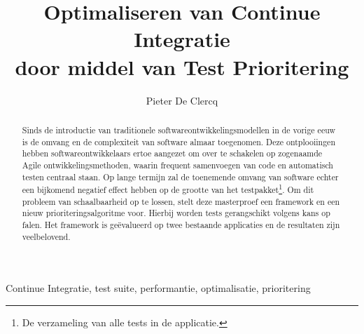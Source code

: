 \documentclass[10pt,twocolumn,twoside]{phdsymp-nl}
\begin{document}
	\title{Optimaliseren van Continue Integratie\\ door middel van Test Prioritering}
	\author{Pieter De Clercq}
	\maketitle
	
	\begin{abstract}
	Sinds de introductie van traditionele softwareontwikkelingsmodellen in de vorige eeuw is de omvang en de complexiteit van software almaar toegenomen. Deze ontplooiingen hebben softwareontwikkelaars ertoe aangezet om over te schakelen op zogenaamde Agile ontwikkelingsmethoden, waarin frequent samenvoegen van code en automatisch testen centraal staan. Op lange termijn zal de toenemende omvang van software echter een bijkomend negatief effect hebben op de grootte van het testpakket\footnote{De verzameling van alle tests in de applicatie.}. Om dit probleem van schaalbaarheid op te lossen, stelt deze masterproef een framework en een nieuw prioriteringsalgoritme voor. Hierbij worden tests gerangschikt volgens kans op falen. Het framework is ge\"evalueerd op twee bestaande applicaties en de resultaten zijn veelbelovend.
	\end{abstract}

	\begin{keywords}
		Continue Integratie, test suite, performantie, optimalisatie, prioritering
	\end{keywords}

	
	
	
	
	\clearpage
	
	
	
	
	
\end{document}
